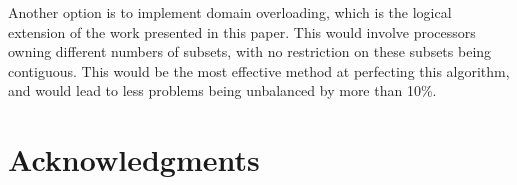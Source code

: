 \documentclass{anstrans}
\begin{document}
Another option is to implement domain overloading, which is the logical extension of the work presented in this paper. This would involve processors owning different numbers of subsets, with no restriction on these subsets being contiguous. This would be the most effective method at perfecting this algorithm, and would lead to less problems being unbalanced by more than 10\%.


\section{Acknowledgments}




\end{document}
